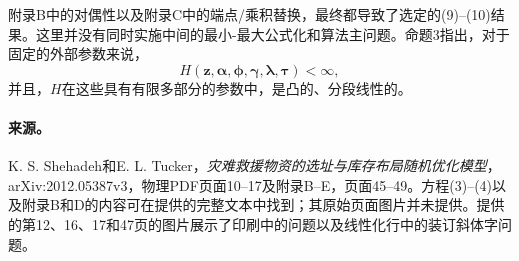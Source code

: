 \documentclass{article}
\begin{document}
附录B中的对偶性以及附录C中的端点/乘积替换，最终都导致了选定的(9)--(10)结果。这里并没有同时实施中间的最小-最大公式化和算法主问题。命题3指出，对于固定的外部参数来说，
\[
H(\boldsymbol z,\boldsymbol\alpha,\boldsymbol\phi,
\boldsymbol\gamma,\boldsymbol\lambda,\boldsymbol\tau)<\infty,
\]
并且，$H$在这些具有有限多部分的参数中，是凸的、分段线性的。

\paragraph{来源。}
K. S. Shehadeh和E. L. Tucker，\emph{灾难救援物资的选址与库存布局随机优化模型}，arXiv:2012.05387v3，物理PDF页面10--17及附录B--E，页面45--49。方程(3)--(4)以及附录B和D的内容可在提供的完整文本中找到；其原始页面图片并未提供。提供的第12、16、17和47页的图片展示了印刷中的问题以及线性化行中的装订斜体字问题。
\end{document}
